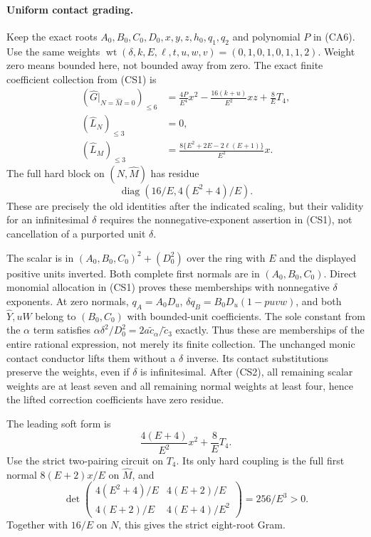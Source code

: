 \paragraph{Uniform contact grading.}
Keep the exact roots $A_0,B_0,C_0,D_0,x,y,z,h_0,q_1,q_2$ and polynomial
$P$ in (CA6). Use the same weights
$\operatorname{wt}(\delta,k,E,\ell,t,u,w,v)=(0,1,0,1,0,1,1,2)$.
Weight zero means bounded here, not bounded away from zero.
The exact finite coefficient collection from (CS1) is
\[
 \begin{aligned}
 (\widehat G|_{N=\widehat M=0})_{\le6}
 &=\frac{4P}{E^4}x^2-\frac{16(k+u)}{E^2}xz+\frac8E T_4,\\
 (\widehat L_N)_{\le3}&=0,\\
 (\widehat L_M)_{\le3}
 &=\frac{8\{E^2+2E-2\ell(E+1)\}}{E^2}x.
 \end{aligned}                                                    \tag{CS2}
\]
The full hard block on $(N,\widehat M)$ has residue
\[
        \operatorname{diag}(16/E,4(E^2+4)/E).          \tag{CS3}
\]
These are precisely the old identities after the indicated scaling,
but their validity for an infinitesimal $\delta$ requires the
nonnegative-exponent assertion in (CS1), not cancellation of a
purported unit $\delta$.

The scalar is in
$(A_0,B_0,C_0)^2+(D_0^2)$ over the ring with $E$ and the displayed
positive units inverted. Both complete first normals are in
$(A_0,B_0,C_0)$. Direct monomial allocation in (CS1) proves these
memberships with nonnegative $\delta$ exponents. At zero normals,
$q_A=A_0D_u$, $\delta q_B=B_0D_u(1-puv w)$, and both
$\widehat Y,u\widehat W$ belong to $(B_0,C_0)$ with bounded-unit
coefficients. The sole constant from the $\alpha$ term satisfies
$\alpha\delta^2/D_0^2=2a\widetilde c_\alpha/\widetilde c_3$ exactly.
Thus these are memberships of the entire rational expression, not merely
its finite collection. The unchanged monic
contact conductor lifts them without a $\delta$ inverse. Its contact
substitutions preserve the weights, even if $\delta$ is infinitesimal.
After (CS2), all remaining scalar weights are at least seven and all
remaining normal weights at least four, hence the lifted correction
coefficients have zero residue. 

The leading soft form is
\[
            \frac{4(E+4)}{E^2}x^2+\frac8E T_4.
\]
Use the strict two-pairing circuit on $T_4$. Its only hard coupling
is the full first normal $8(E+2)x/E$ on $\widehat M$, and
\[
 \det\begin{pmatrix}4(E^2+4)/E&4(E+2)/E\\
                    4(E+2)/E&4(E+4)/E^2\end{pmatrix}
                   =256/E^3>0.                       \tag{CS4}
\]
Together with $16/E$ on $N$, this gives the strict eight-root Gram.

